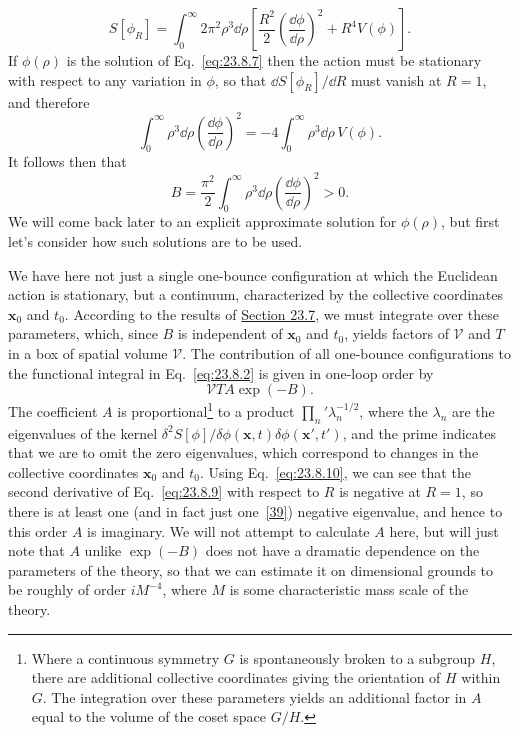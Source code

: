 \begin{equation}
 S[\phi_R]=\int_0^\infty 2\pi^2\rho^3\dd\rho
 \left[
 \frac{R^2}{2}\left(\frac{\dd\phi}{\dd\rho}\right)^2+R^4V(\phi)
 \right].
 \tag{23.8.9}\label{eq:23.8.9}
\end{equation}
If $\phi(\rho)$ is the solution of Eq.~\eqref{eq:23.8.7} then the action must be stationary with respect to any variation in $\phi$, so that $\dd S[\phi_R]/\dd R$ must vanish at $R=1$, and therefore
\begin{equation}
 \int_0^\infty\rho^3\dd\rho\left(\frac{\dd\phi}{\dd\rho}\right)^2
 =-4\int_0^\infty\rho^3\dd\rho\,V(\phi).
 \tag{23.8.10}\label{eq:23.8.10}
\end{equation}
It follows then that
\begin{equation}
 B=\frac{\pi^2}{2}\int_0^\infty\rho^3\dd\rho
 \left(\frac{\dd\phi}{\dd\rho}\right)^2>0.
 \tag{23.8.11}\label{eq:23.8.11}
\end{equation}
We will come back later to an explicit approximate solution for $\phi(\rho)$, but first let's consider how such solutions are to be used.

We have here not just a single one-bounce configuration at which the Euclidean action is stationary, but a continuum, characterized by the collective coordinates $\mathbf x_0$ and $t_0$. According to the results of \hyperref[sec:23.7]{Section 23.7}, we must integrate over these parameters, which, since $B$ is independent of $\mathbf x_0$ and $t_0$, yields factors of $\mathcal V$ and $T$ in a box of spatial volume $\mathcal V$. The contribution of all one-bounce configurations to the functional integral in Eq.~\eqref{eq:23.8.2} is given in one-loop order by
\begin{equation}
 \mathcal VTA\exp(-B).
 \tag{23.8.12}\label{eq:23.8.12}
\end{equation}
The coefficient $A$ is proportional\footnote{Where a continuous symmetry $G$ is spontaneously broken to a subgroup $H$, there are additional collective coordinates giving the orientation of $H$ within $G$. The integration over these parameters yields an additional factor in $A$ equal to the volume of the coset space $G/H$.} to a product $\prod_n'\lambda_n^{-1/2}$, where the $\lambda_n$ are the eigenvalues of the kernel $\delta^2S[\phi]/\delta\phi(\mathbf x,t)\delta\phi(\mathbf x',t')$, and the prime indicates that we are to omit the zero eigenvalues, which correspond to changes in the collective coordinates $\mathbf x_0$ and $t_0$. Using Eq.~\eqref{eq:23.8.10}, we can see that the second derivative of Eq.~\eqref{eq:23.8.9} with respect to $R$ is negative at $R=1$, so there is at least one (and in fact just one~\hyperref[ch23-ref-39]{[39]}) negative eigenvalue, and hence to this order $A$ is imaginary. We will not attempt to calculate $A$ here, but will just note that $A$ unlike $\exp(-B)$ does not have a dramatic dependence on the parameters of the theory, so that we can estimate it on dimensional grounds to be roughly of order $iM^{-4}$, where $M$ is some characteristic mass scale of the theory.

